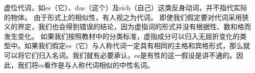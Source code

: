 虚位代词，如es（它）、das（这个）及sich（自己）这类反身动词，并不指代实际的物体。
由于形式上的相似性，有人视之为代词。
即使我们假定要对代词采用狭义的界定，我们也会得到错误的结论，因为虚指词的形式并没有根据性、数和格而发生变化。
如果我们按照教材中的分类标准，虚指成分可以归入无屈折变化的类型中。如果我们假定es（它）与人称代词一定具有相同的主格和宾格形式，那么就可以将它们归入名词。我们就有必要承认，es是有性的这一假设是讲不通的。因此，我们将es看作是与人称代词相似的中性名词。

